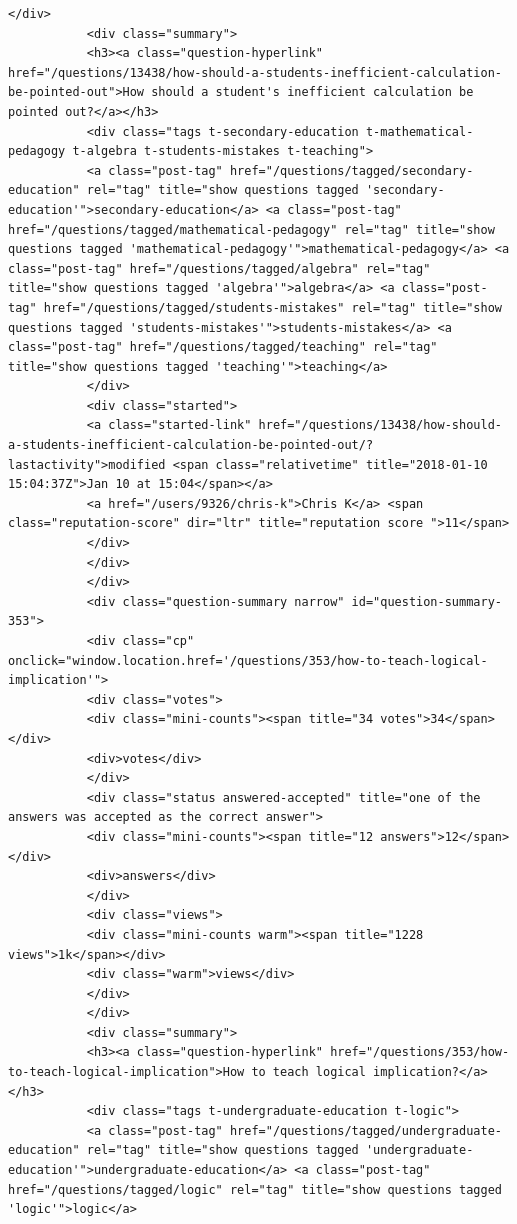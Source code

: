 \documentclass[11pt]{article}
\begin{document}
\begin{Verbatim}[commandchars=\\\{\}]
           </div>
           <div class="summary">
           <h3><a class="question-hyperlink" href="/questions/13438/how-should-a-students-inefficient-calculation-be-pointed-out">How should a student's inefficient calculation be pointed out?</a></h3>
           <div class="tags t-secondary-education t-mathematical-pedagogy t-algebra t-students-mistakes t-teaching">
           <a class="post-tag" href="/questions/tagged/secondary-education" rel="tag" title="show questions tagged 'secondary-education'">secondary-education</a> <a class="post-tag" href="/questions/tagged/mathematical-pedagogy" rel="tag" title="show questions tagged 'mathematical-pedagogy'">mathematical-pedagogy</a> <a class="post-tag" href="/questions/tagged/algebra" rel="tag" title="show questions tagged 'algebra'">algebra</a> <a class="post-tag" href="/questions/tagged/students-mistakes" rel="tag" title="show questions tagged 'students-mistakes'">students-mistakes</a> <a class="post-tag" href="/questions/tagged/teaching" rel="tag" title="show questions tagged 'teaching'">teaching</a>
           </div>
           <div class="started">
           <a class="started-link" href="/questions/13438/how-should-a-students-inefficient-calculation-be-pointed-out/?lastactivity">modified <span class="relativetime" title="2018-01-10 15:04:37Z">Jan 10 at 15:04</span></a>
           <a href="/users/9326/chris-k">Chris K</a> <span class="reputation-score" dir="ltr" title="reputation score ">11</span>
           </div>
           </div>
           </div>
           <div class="question-summary narrow" id="question-summary-353">
           <div class="cp" onclick="window.location.href='/questions/353/how-to-teach-logical-implication'">
           <div class="votes">
           <div class="mini-counts"><span title="34 votes">34</span></div>
           <div>votes</div>
           </div>
           <div class="status answered-accepted" title="one of the answers was accepted as the correct answer">
           <div class="mini-counts"><span title="12 answers">12</span></div>
           <div>answers</div>
           </div>
           <div class="views">
           <div class="mini-counts warm"><span title="1228 views">1k</span></div>
           <div class="warm">views</div>
           </div>
           </div>
           <div class="summary">
           <h3><a class="question-hyperlink" href="/questions/353/how-to-teach-logical-implication">How to teach logical implication?</a></h3>
           <div class="tags t-undergraduate-education t-logic">
           <a class="post-tag" href="/questions/tagged/undergraduate-education" rel="tag" title="show questions tagged 'undergraduate-education'">undergraduate-education</a> <a class="post-tag" href="/questions/tagged/logic" rel="tag" title="show questions tagged 'logic'">logic</a>

\end{Verbatim}
\end{document}
